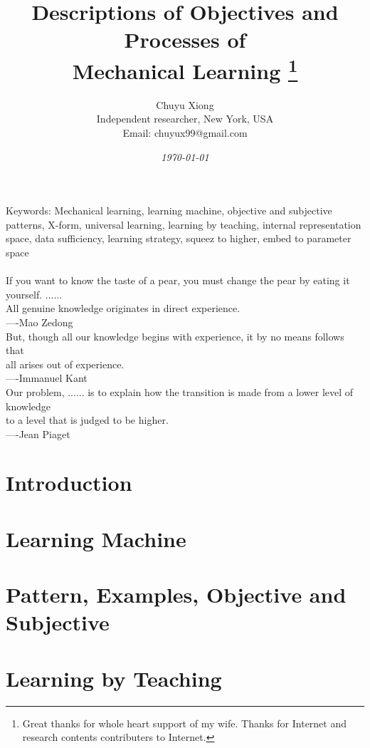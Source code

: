 \documentclass[twoside]{article}      %
\date{\small\it \today}
\title{Descriptions of Objectives and Processes of \\ Mechanical Learning
\footnote{Great thanks for whole heart support of my wife. Thanks for Internet and research contents contributers to Internet.}}
\author{ Chuyu Xiong \\
{\small Independent researcher, New York, USA} \\
{\small Email: chuyux99@gmail.com}
}
\begin{document}
\maketitle
\begin{abstract}

\end{abstract}

{\sc Keywords: Mechanical learning, learning machine, objective and subjective patterns, X-form, universal learning, learning by teaching, internal representation space, data sufficiency, learning strategy, squeez to higher, embed to parameter space} \\ 
 \\

If you want to know the taste of a pear, you must change the pear by eating it yourself. ...... \\
All genuine knowledge originates in direct experience. \\
\indent \hspace{20pt} ----Mao Zedong \\

But, though all our knowledge begins with experience, it by no means follows that \\
all arises out of experience. \\
\indent \hspace{20pt} ----Immanuel Kant \\

Our problem, ...... is to explain how the transition is made from a lower level of knowledge \\
to a level that is judged to be higher. \\
\indent \hspace{20pt} ----Jean Piaget


\section{Introduction}

\section{Learning Machine}\label{table}

\section{Pattern, Examples, Objective and Subjective}\label{table}

\section{Learning by Teaching}\label{table}

\end{document}
